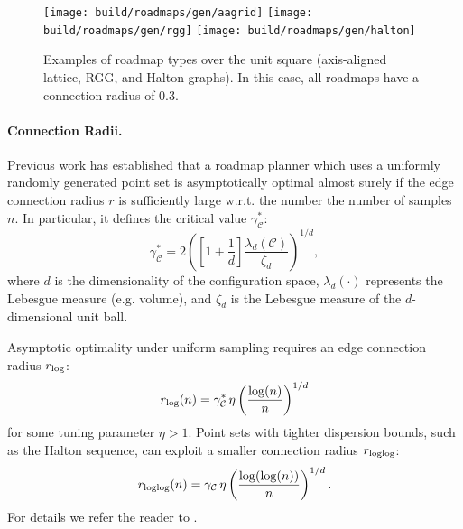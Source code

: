 \begin{figure}
   \centering
   \texttt{[image: build/roadmaps/gen/aagrid]}
   \texttt{[image: build/roadmaps/gen/rgg]}
   \texttt{[image: build/roadmaps/gen/halton]}
   \caption{Examples of roadmap types over the unit square
      (axis-aligned lattice, RGG, and Halton graphs).
      In this case, all roadmaps have a connection radius of 0.3.}
\end{figure}

\paragraph{Connection Radii.}
Previous work \citep{karaman2011samplingoptimal} has established
that a roadmap planner which uses a uniformly randomly generated
point set is asymptotically optimal almost surely
if the edge connection radius $r$ is sufficiently large w.r.t.
the number the number of samples $n$.
In particular,
it defines the critical value $\gamma^*_{\mathcal{C}}$:
\begin{equation}
   \gamma^*_{\mathcal{C}}
      = 2 \left( \left[ 1 + \frac{1}{d} \right]
         \frac{\lambda_d(\mathcal{C})}{\zeta_d} \right)^{1/d},
\end{equation}
where $d$ is the dimensionality of the configuration space,
$\lambda_d(\cdot)$ represents the Lebesgue measure (e.g. volume),
and $\zeta_d$ is the Lebesgue measure of the $d$-dimensional unit ball.

Asymptotic optimality under uniform sampling requires
an edge connection radius $r_{\mbox{\scriptsize log}}$:
\begin{equation}
   r_{\mbox{\scriptsize log}}(n) =  \gamma^*_{\mathcal{C}} \, \eta
      \left( \frac{\log(n)}{n} \right)^{1/d}
\end{equation}
for some tuning parameter $\eta > 1$.
Point sets with tighter dispersion bounds,
such as the Halton sequence,
can exploit a smaller connection radius $r_{\mbox{\scriptsize loglog}}$:
\begin{equation}
   r_{\mbox{\scriptsize loglog}}(n) = \gamma_{\mathcal{C}} \, \eta
      \left( \frac{\log(\log(n))}{n} \right)^{1/d}.
\end{equation}
For details we refer the reader
to \citep{janson2015deterministicsampling}.

